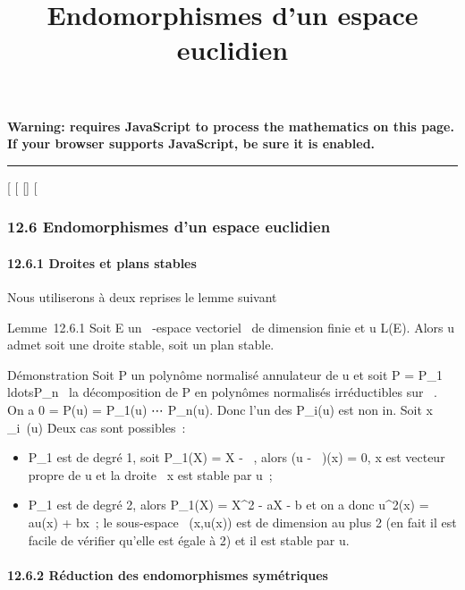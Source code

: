 \documentclass[]{article}
\title{Endomorphismes d'un espace euclidien}
\author{}
\date{}
\begin{document}
\maketitle

\textbf{Warning: 
requires JavaScript to process the mathematics on this page.\\ If your
browser supports JavaScript, be sure it is enabled.}

\begin{center}\rule{3in}{0.4pt}\end{center}

{[}
{[}
{[}{]}
{[}

\subsubsection{12.6 Endomorphismes d'un espace euclidien}

\paragraph{12.6.1 Droites et plans stables}

Nous utiliserons à deux reprises le lemme suivant

Lemme~12.6.1 Soit E un ~-espace vectoriel ~de dimension finie et u \in
L(E). Alors u admet soit une droite stable, soit un plan stable.

Démonstration Soit P un polynôme normalisé annulateur de u et soit P =
P\_1\\ldotsP\_n~
la décomposition de P en polynômes normalisés irréductibles sur ~. On a
0 = P(u) = P\_1(u) \cdot⋯ \cdot
P\_n(u). Donc l'un des P\_i(u) est non in\jmathectif. Soit x
\in\mathrmKerP\_i~(u)
\diagdown\0\. Deux cas sont possibles~:

\begin{itemize}
\itemsep1pt\parskip0pt
\item
  P\_1 est de degré 1, soit P\_1(X) = X - \lambda~, alors (u -
  \lambda~\mathrmId)(x) = 0, x est vecteur propre de u et la
  droite ~x est stable par u~;
\item
  P\_1 est de degré 2, alors P\_1(X) = X^2 -
  aX - b et on a donc u^2(x) = au(x) + bx~; le sous-espace
  \mathrmVect~(x,u(x)) est
  de dimension au plus 2 (en fait il est facile de vérifier qu'elle est
  égale à 2) et il est stable par u.
\end{itemize}

\paragraph{12.6.2 Réduction des endomorphismes symétriques}
\end{document}
